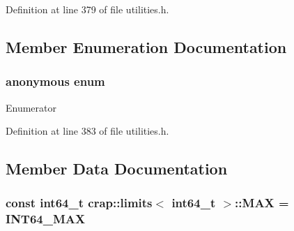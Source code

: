Definition at line 379 of file utilities.\+h.



\subsection{Member Enumeration Documentation}
\hypertarget{structcrap_1_1limits_3_01int64__t_01_4_a575b4571877a8b378a73249189d9e634}{\subsubsection[{anonymous enum}]{\setlength{\rightskip}{0pt plus 5cm}anonymous enum}}\label{structcrap_1_1limits_3_01int64__t_01_4_a575b4571877a8b378a73249189d9e634}
\begin{Desc}
\item[Enumerator]\par
\begin{description}
\item[{\em 
\hypertarget{structcrap_1_1limits_3_01int64__t_01_4_a575b4571877a8b378a73249189d9e634acf53b7e1c565b02ca4fcc9ff703a4a97}{I\+S\+\_\+\+I\+N\+T}\label{structcrap_1_1limits_3_01int64__t_01_4_a575b4571877a8b378a73249189d9e634acf53b7e1c565b02ca4fcc9ff703a4a97}
}]\item[{\em 
\hypertarget{structcrap_1_1limits_3_01int64__t_01_4_a575b4571877a8b378a73249189d9e634a2db27bf399f2fcc1977572ab2bfb9d66}{I\+S\+\_\+\+S\+I\+G\+N\+E\+D}\label{structcrap_1_1limits_3_01int64__t_01_4_a575b4571877a8b378a73249189d9e634a2db27bf399f2fcc1977572ab2bfb9d66}
}]\end{description}
\end{Desc}


Definition at line 383 of file utilities.\+h.



\subsection{Member Data Documentation}
\hypertarget{structcrap_1_1limits_3_01int64__t_01_4_a0465e299affe12a893a3d5faa6ecf0df}{
\subsubsection[{M\+A\+X}]{\setlength{\rightskip}{0pt plus 5cm}const int64\+\_\+t {\bf crap\+::limits}$<$ int64\+\_\+t $>$\+::M\+A\+X = {\bf I\+N\+T64\+\_\+\+M\+A\+X}\hspace{0.3cm}{\ttfamily [static]}}}\label{structcrap_1_1limits_3_01int64__t_01_4_a0465e299affe12a893a3d5faa6ecf0df}


